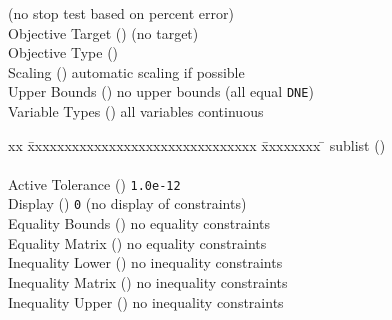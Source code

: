 \begin{tabbing}
       (no stop test based on percent error)  \\
  \>Objective Target                   ()
       (no target)  \\
  \>Objective Type                     ()
        \\
  \>Scaling                            ()
      \>automatic scaling if possible  \\
  \>Upper Bounds                       ()
      \>no upper bounds (all equal {\tt DNE})  \\
  \>Variable Types                     ()
      \>all variables continuous
\end{tabbing}

\begin{tabbing}
  xx \= xxxxxxxxxxxxxxxxxxxxxxxxxxxxxxx \= xxxxxxxx \= \kill
   sublist ()  \\
                 
        \\

  \>Active Tolerance                   ()
      \> {\tt 1.0e-12}  \\
  \>Display                            ()
      \> {\tt 0} (no display of constraints)  \\
  \>Equality Bounds                    ()
      \> no equality constraints  \\
  \>Equality Matrix                    ()
      \> no equality constraints  \\
  \>Inequality Lower                   ()
      \> no inequality constraints  \\
  \>Inequality Matrix                  ()
      \> no inequality constraints  \\
  \>Inequality Upper                   ()
      \> no inequality constraints
\end{tabbing}

